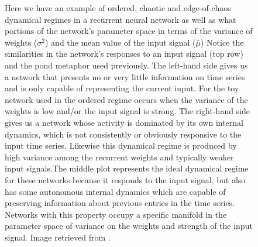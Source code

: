 \begin{figure}[h]
\centering
{}
\caption[Nils Bertschinger and Thomas Natchl\"ager]{Here we have an example of ordered, chaotic and edge-of-chaos dynamical regimes in a recurrent neural network as well as what portions of the network's parameter space in terms of the variance of weights ($\sigma^2$) and the mean value of the input signal ($\bar{\mu}$) Notice the similarities in the network's responses to an input signal (top row) and the pond metaphor used previously. The left-hand side gives us a network that presents no or very little information on time series and is only capable of representing the current input. For the toy network used in \cite{bertschinger2004real} the ordered regime occurs when the variance of the weights is low and/or the input signal is strong. The right-hand side gives us a network whose activity is dominated by its own internal dynamics, which is not consistently or obviously responsive to the input time series. Likewise this dynamical regime is produced by high variance among the recurrent weights and typically weaker input signals.The middle plot represents the ideal dynamical regime for these networks because it responds to the input signal, but also has some autonomous internal dynamics which are capable of preserving information about previous entries in the time series. Networks with this property occupy a specific manifold in the parameter space of variance on the weights and strength of the input signal. Image retrieved from \cite{bertschinger2004real}.}
\label{F:edgechaos}
\end{figure}

